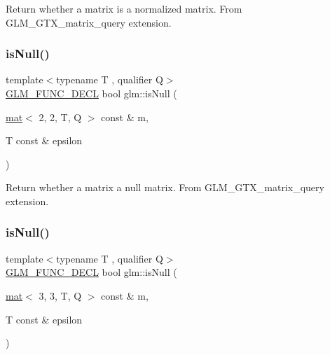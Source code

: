 Return whether a matrix is a normalized matrix. From G\+L\+M\+\_\+\+G\+T\+X\+\_\+matrix\+\_\+query extension. \mbox{\label{group__gtx__matrix__query_ga9790ec222ce948c0ff0d8ce927340dba}} 
\subsubsection{\texorpdfstring{is\+Null()}{isNull()}\hspace{0.1cm}{\footnotesize\ttfamily [1/3]}}
{\footnotesize\ttfamily template$<$typename T , qualifier Q$>$ \\
\hyperlink{setup_8hpp_ab2d052de21a70539923e9bcbf6e83a51}{G\+L\+M\+\_\+\+F\+U\+N\+C\+\_\+\+D\+E\+CL} bool glm\+::is\+Null (\begin{DoxyParamCaption}\item[{\hyperlink{structglm_1_1mat}{mat}$<$ 2, 2, T, Q $>$ const \&}]{m,  }\item[{T const \&}]{epsilon }\end{DoxyParamCaption})}

Return whether a matrix a null matrix. From G\+L\+M\+\_\+\+G\+T\+X\+\_\+matrix\+\_\+query extension. \mbox{\label{group__gtx__matrix__query_gae14501c6b14ccda6014cc5350080103d}} 
\subsubsection{\texorpdfstring{is\+Null()}{isNull()}\hspace{0.1cm}{\footnotesize\ttfamily [2/3]}}
{\footnotesize\ttfamily template$<$typename T , qualifier Q$>$ \\
\hyperlink{setup_8hpp_ab2d052de21a70539923e9bcbf6e83a51}{G\+L\+M\+\_\+\+F\+U\+N\+C\+\_\+\+D\+E\+CL} bool glm\+::is\+Null (\begin{DoxyParamCaption}\item[{\hyperlink{structglm_1_1mat}{mat}$<$ 3, 3, T, Q $>$ const \&}]{m,  }\item[{T const \&}]{epsilon }\end{DoxyParamCaption})}

